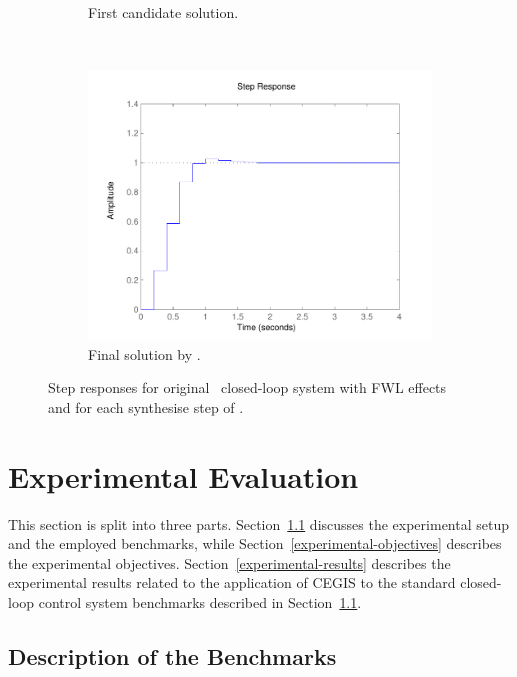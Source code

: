 \documentclass{sig-alternate-05-2015}
\begin{document}
\begin{figure}
\begin{subfigure}[b]{0.3\textwidth}
        \caption{First candidate solution.}
        \label{fig:step1}
    \end{subfigure}
    ~
    \begin{subfigure}[b]{0.3\textwidth}
        \includegraphics[width=\textwidth]{figures/runningexample_step2.pdf}
        \caption{Final solution by \tool.}
        \label{fig:step2}
    \end{subfigure}
    \caption{Step responses for original~\cite{DBLP:conf/hybrid/WangGRJF16} closed-loop system with FWL effects and for each {\sc synthesise} step of \tool.}\label{fig:step}
\end{figure}

\section{Experimental Evaluation}\label{sec:experiments}

This section is split into three parts. Section~\ref{experimental-setup}
discusses the experimental setup and the employed benchmarks, while
Section~\ref{experimental-objectives} describes the experimental objectives. 
Section~\ref{experimental-results} describes the experimental results
related to the application of CEGIS to the standard closed-loop control
system benchmarks described in Section~\ref{experimental-setup}.

\subsection{Description of the Benchmarks}
\label{experimental-setup}
\end{document}
